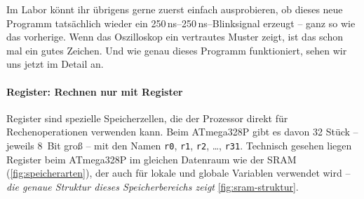 \documentclass[a4paper,12pt]{article}
\begin{document}
Im Labor könnt ihr übrigens gerne zuerst einfach ausprobieren, ob dieses neue
Programm tatsächlich wieder ein 250\,ns–250\,ns–Blinksignal erzeugt – ganz so
wie das vorherige. Wenn das Oszilloskop ein vertrautes Muster zeigt, ist das
schon mal ein gutes Zeichen. Und wie genau dieses Programm funktioniert, sehen
wir uns jetzt im Detail an.

\paragraph{Register: Rechnen nur mit Register}

Register sind spezielle Speicherzellen, die der Prozessor direkt für
Rechenoperationen verwenden kann. Beim ATmega328P gibt es davon 32 Stück –
jeweils 8~Bit groß – mit den Namen \texttt{r0}, \texttt{r1}, \texttt{r2},
\dots, \texttt{r31}.  Technisch gesehen liegen Register beim ATmega328P im
gleichen Datenraum wie der SRAM (\autoref{fig:speicherarten}), der auch für
lokale und globale Variablen verwendet wird – \textit{die genaue Struktur
dieses Speicherbereichs zeigt} \autoref{fig:sram-struktur}.
\end{document}
